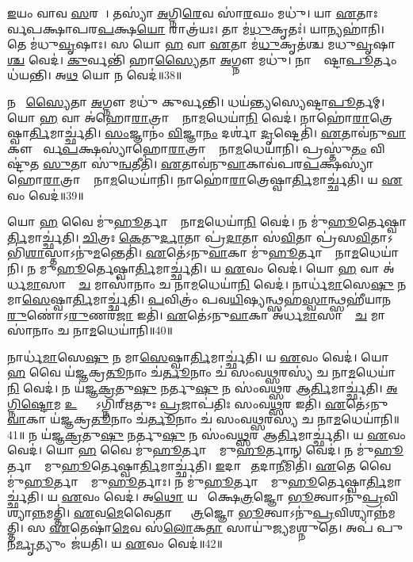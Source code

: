    \ul{𑌇}𑌯𑌂 𑌵𑌾𑌵 \ul{𑌸}𑌰𑌘𑌾᳚।
   𑌤𑌸𑍍𑌯𑌾॑ \ul{𑌅}𑌗𑍍𑌨𑌿\ul{𑌰𑍇}𑌵 𑌸𑌾॑\ul{𑌰}𑌘𑌂 𑌮𑌧𑍁॑।
   𑌯𑌾 \ul{𑌏}𑌤𑌾𑌃 𑌪𑍂᳚𑌰𑍍𑌵𑌪𑌕𑍍𑌷𑌾𑌪𑌰\ul{𑌪}𑌕𑍍𑌷\ul{𑌯𑍋} 𑌰𑌾𑌤𑍍𑌰॑𑌯𑌃।
   𑌤𑌾 𑌮॑\ul{𑌧𑍁}𑌕𑍃𑌤𑌃॑।
   𑌯𑌾𑌨𑍍𑌯𑌹𑌾॑𑌨𑌿।
   𑌤𑍇 𑌮॑𑌧𑍁\ul{𑌵𑍃}𑌷𑌾𑌃।
   𑌸 𑌯𑍋 \ul{𑌹} 𑌵𑌾 \ul{𑌏}𑌤𑌾 𑌮॑\ul{𑌧𑍁}𑌕𑍃𑌤॑𑌶𑍍𑌚 𑌮𑌧𑍁\ul{𑌵𑍃}𑌷𑌾\ul{𑌶𑍍𑌚} 𑌵𑍇𑌦॑।
   \ul{𑌕𑍁}𑌰𑍍𑌵𑌨𑍍𑌤𑌿॑ 𑌹𑌾\ul{𑌸𑍍𑌯𑍈}𑌤𑌾 \ul{𑌅}𑌗𑍍𑌨𑍗 𑌮𑌧𑍁॑।
   𑌨𑌾𑌸𑍍𑌯𑍇᳚𑌷𑍍𑌟𑌾\ul{𑌪𑍂}𑌰𑍍𑌤𑌂 𑌧॑𑌯𑌨𑍍𑌤𑌿।
   𑌅\ul{𑌥} 𑌯𑍋 𑌨 𑌵𑍇𑌦॑॥38॥

   𑌨 𑌹𑌾᳚\ul{𑌸𑍍𑌯𑍈}𑌤𑌾 \ul{𑌅}𑌗𑍍𑌨𑍗 𑌮𑌧𑍁॑ 𑌕𑍁𑌰𑍍𑌵𑌨𑍍𑌤𑌿।
   𑌧𑌯॑𑌨𑍍𑌤𑍍𑌯𑌸𑍍𑌯𑍇𑌷𑍍𑌟𑌾\ul{𑌪𑍂}𑌰𑍍𑌤𑌮𑍍।
   𑌯𑍋 \ul{𑌹} 𑌵𑌾 𑌅॑𑌹𑍋\ul{𑌰𑌾}𑌤𑍍𑌰𑌾𑌣𑌾𑌂᳚ 𑌨𑌾\ul{𑌮}𑌧𑍇𑌯𑌾॑\ul{𑌨𑌿} 𑌵𑍇𑌦॑।
   𑌨𑌾𑌹𑍋॑\ul{𑌰𑌾}𑌤𑍍𑌰𑍇𑌷𑍍𑌵𑌾\ul{𑌰𑍍𑌤𑌿}𑌮𑌾𑌰𑍍𑌚𑍍𑌛॑𑌤𑌿।
   \ul{𑌸𑌂}𑌜𑍍𑌞𑌾𑌨𑌂॑ \ul{𑌵𑌿}𑌜𑍍𑌞𑌾\ul{𑌨𑌂} 𑌦𑌰𑍍\mbox{}𑌶𑌾॑ \ul{𑌦𑍃}𑌷𑍍𑌟𑍇𑌤𑌿॑।
   \ul{𑌏}𑌤𑌾𑌵॑𑌨𑍁\ul{𑌵𑌾}𑌕𑍗 𑌪𑍂᳚𑌰𑍍𑌵\ul{𑌪}𑌕𑍍𑌷𑌸𑍍𑌯𑌾॑\-𑌹𑍋\ul{𑌰𑌾}𑌤𑍍𑌰𑌾𑌣𑌾𑌂᳚ 𑌨𑌾\ul{𑌮}𑌧𑍇𑌯𑌾॑𑌨𑌿।
   𑌪𑍍𑌰𑌸𑍍𑌤𑍁॑\ul{𑌤𑌂} 𑌵𑌿𑌷𑍍𑌟𑍁॑𑌤 \ul{𑌸𑍁}𑌤𑌾 𑌸𑍁॑\ul{𑌨𑍍𑌵}𑌤𑍀𑌤𑌿॑।
   \ul{𑌏}𑌤𑌾𑌵॑𑌨𑍁\ul{𑌵𑌾}𑌕𑌾𑌵॑𑌪𑌰\-\ul{𑌪}𑌕𑍍𑌷𑌸𑍍𑌯𑌾॑𑌹𑍋\ul{𑌰𑌾}𑌤𑍍𑌰𑌾𑌣𑌾𑌂᳚ 𑌨𑌾\ul{𑌮}𑌧𑍇𑌯𑌾॑𑌨𑌿।
   𑌨𑌾𑌹𑍋॑\ul{𑌰𑌾}𑌤𑍍𑌰𑍇𑌷𑍍𑌵𑌾\ul{𑌰𑍍𑌤𑌿}𑌮𑌾𑌰𑍍𑌚𑍍𑌛॑𑌤𑌿।
   𑌯 \ul{𑌏}𑌵𑌂 𑌵𑍇𑌦॑॥39॥

   𑌯𑍋 \ul{𑌹} 𑌵𑍈 𑌮𑍁॑\ul{𑌹𑍂}𑌰𑍍𑌤𑌾𑌨𑌾𑌂᳚ 𑌨𑌾\ul{𑌮}𑌧𑍇𑌯𑌾॑\ul{𑌨𑌿} 𑌵𑍇𑌦॑।
   𑌨 𑌮𑍁॑\ul{𑌹𑍂}𑌰𑍍𑌤𑍇𑌷𑍍𑌵𑌾\ul{𑌰𑍍𑌤𑌿}𑌮𑌾𑌰𑍍𑌚𑍍𑌛॑𑌤𑌿।
   \ul{𑌚𑌿}𑌤𑍍𑌰𑌃 \ul{𑌕𑍇}𑌤𑍁\ul{𑌰𑍍𑌦𑌾}𑌤𑌾 𑌪𑍍𑌰॑\ul{𑌦𑌾}𑌤𑌾 𑌸॑\ul{𑌵𑌿}𑌤𑌾 𑌪𑍍𑌰॑𑌸\ul{𑌵𑌿}𑌤𑌾𑌽𑌭𑌿॑\ul{𑌶𑌾}𑌸𑍍𑌤𑌾𑌽𑌨𑍁॑\-\ul{𑌮}𑌨𑍍𑌤𑍇𑌤𑌿॑।
   \ul{𑌏}𑌤𑍇॑𑌽𑌨𑍁\ul{𑌵𑌾}𑌕𑌾 𑌮𑍁॑\ul{𑌹𑍂}𑌰𑍍𑌤𑌾𑌨𑌾𑌂᳚ 𑌨𑌾\ul{𑌮}𑌧𑍇𑌯𑌾॑𑌨𑌿।
   𑌨 𑌮𑍁\ul{𑌹𑍂}𑌰𑍍𑌤𑍇𑌷𑍍𑌵𑌾\ul{𑌰𑍍𑌤𑌿}𑌮𑌾𑌰𑍍𑌚𑍍𑌛॑𑌤𑌿।
   𑌯 \ul{𑌏}𑌵𑌂 𑌵𑍇𑌦॑।
   𑌯𑍋 \ul{𑌹} 𑌵𑌾 𑌅॑𑌰𑍍𑌧\ul{𑌮𑌾}𑌸𑌾𑌨𑌾𑌂᳚ \ul{𑌚} 𑌮𑌾𑌸𑌾॑𑌨𑌾𑌂 𑌚 𑌨𑌾\ul{𑌮}𑌧𑍇𑌯𑌾॑\ul{𑌨𑌿} 𑌵𑍇𑌦॑।
   𑌨𑌾𑌰𑍍𑌧॑\ul{𑌮𑌾}𑌸𑍇\ul{𑌷𑍁} 𑌨 𑌮𑌾\ul{𑌸𑍇}𑌷𑍍𑌵𑌾\ul{𑌰𑍍𑌤𑌿}𑌮𑌾𑌰𑍍𑌚𑍍𑌛॑𑌤𑌿।
   \ul{𑌪}𑌵𑌿𑌤𑍍𑌰𑌂॑ 𑌪𑌵\ul{𑌯𑌿}𑌷𑍍𑌯𑌨𑍍𑌥𑍍𑌸𑌹॑\-\ul{𑌸𑍍𑌵𑌾}𑌨𑍍𑌥𑍍𑌸𑌹𑍀॑𑌯𑌾𑌨\ul{𑌰𑍁}𑌣𑍋॑𑌽\ul{𑌰𑍁}𑌣𑌰॑\ul{𑌜𑌾} 𑌇𑌤𑌿॑।
   \ul{𑌏}𑌤𑍇॑𑌽𑌨𑍁\ul{𑌵𑌾}𑌕𑌾 𑌅॑𑌰𑍍𑌧\ul{𑌮𑌾}𑌸𑌾𑌨𑌾𑌂᳚ \ul{𑌚} 𑌮𑌾𑌸𑌾॑𑌨𑌾𑌂 𑌚 𑌨𑌾\ul{𑌮}𑌧𑍇𑌯𑌾॑𑌨𑌿॥40॥

   𑌨𑌾𑌰𑍍𑌧॑\ul{𑌮𑌾}𑌸𑍇\ul{𑌷𑍁} 𑌨 𑌮𑌾\ul{𑌸𑍇}𑌷𑍍𑌵𑌾\ul{𑌰𑍍𑌤𑌿}𑌮𑌾𑌰𑍍𑌚𑍍𑌛॑𑌤𑌿।
   𑌯 \ul{𑌏}𑌵𑌂 𑌵𑍇𑌦॑।
   𑌯𑍋 \ul{𑌹} 𑌵𑍈 𑌯॑𑌜𑍍𑌞𑌕𑍍𑌰\ul{𑌤𑍂}𑌨𑌾𑌂 𑌚॑\ul{𑌰𑍍𑌤𑍂}𑌨𑌾𑌂 𑌚॑ 𑌸𑌂𑌵\ul{𑌥𑍍𑌸}𑌰𑌸𑍍𑌯॑ 𑌚 𑌨𑌾\ul{𑌮}𑌧𑍇𑌯𑌾॑\ul{𑌨𑌿} 𑌵𑍇𑌦॑।
   𑌨 𑌯॑𑌜𑍍𑌞\ul{𑌕𑍍𑌰}𑌤𑍁\ul{𑌷𑍁} 𑌨𑌰𑍍𑌤𑍁\ul{𑌷𑍁} 𑌨 𑌸𑌂॑𑌵\ul{𑌥𑍍𑌸}𑌰 𑌆\ul{𑌰𑍍𑌤𑌿}𑌮𑌾𑌰𑍍𑌚𑍍𑌛॑𑌤𑌿।
   \ul{𑌅}\ul{𑌗𑍍𑌨𑌿}\ul{𑌷𑍍𑌟𑍋}𑌮 \ul{𑌉}𑌕𑍍𑌥𑍍𑌯𑍋᳚𑌽𑌗𑍍𑌨𑌿𑌰𑍍{‌}\ul{𑌋}𑌤𑍁𑌃 \ul{𑌪𑍍𑌰}𑌜𑌾𑌪॑𑌤𑌿𑌃 𑌸𑌂𑌵\ul{𑌥𑍍𑌸}𑌰 𑌇𑌤𑌿॑।
   \ul{𑌏}𑌤𑍇॑𑌽𑌨𑍁\ul{𑌵𑌾}𑌕𑌾 𑌯॑𑌜𑍍𑌞𑌕𑍍𑌰\ul{𑌤𑍂}𑌨𑌾𑌂 𑌚॑\ul{𑌰𑍍𑌤𑍂}𑌨𑌾𑌂 𑌚॑ 𑌸𑌂𑌵\ul{𑌥𑍍𑌸}𑌰𑌸𑍍𑌯॑ 𑌚 𑌨𑌾\ul{𑌮}𑌧𑍇𑌯𑌾॑𑌨𑌿॥41॥
   𑌨 𑌯॑𑌜𑍍𑌞\ul{𑌕𑍍𑌰}𑌤𑍁\ul{𑌷𑍁} 𑌨𑌰𑍍𑌤𑍁\ul{𑌷𑍁} 𑌨 𑌸𑌂॑𑌵\ul{𑌥𑍍𑌸}𑌰 𑌆\ul{𑌰𑍍𑌤𑌿}𑌮𑌾𑌰𑍍𑌚𑍍𑌛॑𑌤𑌿।
   𑌯 \ul{𑌏}𑌵𑌂 𑌵𑍇𑌦॑।
   𑌯𑍋 \ul{𑌹} 𑌵𑍈 𑌮𑍁॑\ul{𑌹𑍂}𑌰𑍍𑌤𑌾𑌨𑌾𑌂᳚ 𑌮𑍁\ul{𑌹𑍂}𑌰𑍍𑌤𑌾𑌨𑍍 𑌵𑍇𑌦॑।
   𑌨 𑌮𑍁॑\ul{𑌹𑍂}𑌰𑍍𑌤𑌾𑌨𑌾𑌂᳚ 𑌮𑍁\ul{𑌹𑍂}𑌰𑍍𑌤𑍇𑌷𑍍𑌵𑌾\ul{𑌰𑍍𑌤𑌿}𑌮𑌾𑌰𑍍𑌚𑍍𑌛॑𑌤𑌿।
   \ul{𑌇}𑌦𑌾𑌨𑍀𑌂᳚ \ul{𑌤}𑌦𑌾\ul{𑌨𑍀}𑌮𑌿𑌤𑌿॑।
   \ul{𑌏}𑌤𑍇 𑌵𑍈 𑌮𑍁॑\ul{𑌹𑍂}𑌰𑍍𑌤𑌾𑌨𑌾𑌂᳚ 𑌮𑍁\ul{𑌹𑍂}𑌰𑍍𑌤𑌾𑌃।
   𑌨 𑌮𑍁॑\ul{𑌹𑍂}𑌰𑍍𑌤𑌾𑌨𑌾𑌂᳚ 𑌮𑍁\ul{𑌹𑍂}𑌰𑍍𑌤𑍇𑌷𑍍𑌵𑌾\ul{𑌰𑍍𑌤𑌿}𑌮𑌾𑌰𑍍𑌚𑍍𑌛॑𑌤𑌿।
   𑌯 \ul{𑌏}𑌵𑌂 𑌵𑍇𑌦॑।
   𑌅\ul{𑌥𑍋} 𑌯𑌥𑌾᳚ 𑌕𑍍𑌷𑍇\ul{𑌤𑍍𑌰}𑌜𑍍𑌞𑍋 \ul{𑌭𑍂}𑌤𑍍𑌵𑌾𑌽𑌨𑍁॑\ul{𑌪𑍍𑌰}𑌵𑌿𑌶𑍍𑌯𑌾\ul{𑌨𑍍𑌨}𑌮𑌤𑍍𑌤𑌿॑।
   \ul{𑌏}𑌵\ul{𑌮𑍇}𑌵𑍈𑌤𑌾𑌨𑍍𑌕𑍍𑌷𑍇᳚\ul{𑌤𑍍𑌰}𑌜𑍍𑌞𑍋 \ul{𑌭𑍂}𑌤𑍍𑌵𑌾𑌽𑌨𑍁॑\ul{𑌪𑍍𑌰}𑌵𑌿𑌶𑍍𑌯𑌾𑌨𑍍𑌨॑𑌮𑌤𑍍𑌤𑌿।
   𑌸 \ul{𑌏}𑌤𑍇𑌷𑌾॑\ul{𑌮𑍇}𑌵 𑌸॑\ul{𑌲𑍋}𑌕\ul{𑌤𑌾}\ul{} 𑌸𑌾𑌯𑍁॑𑌜𑍍𑌯𑌮𑌶𑍍𑌨𑍁𑌤𑍇।
   𑌅𑌪॑ 𑌪𑍁𑌨\ul{𑌰𑍍𑌮𑍃}𑌤𑍍𑌯𑍁𑌂 𑌜॑𑌯𑌤𑌿।
   𑌯 \ul{𑌏}𑌵𑌂 𑌵𑍇𑌦॑॥42॥
\anuvakamend
				
